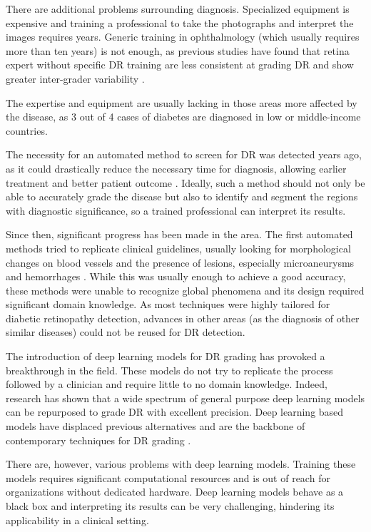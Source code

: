There are additional problems surrounding diagnosis. Specialized equipment is expensive and training a professional to take the photographs and interpret the images requires years. Generic training in ophthalmology (which usually requires more than ten years) is not enough, as previous studies have found that retina expert without specific DR training are less consistent at grading DR and show greater inter-grader variability \cite{grzybowski2022variability}.

The expertise and equipment are usually lacking in those areas more affected by the disease, as 3 out of 4 cases of diabetes are diagnosed in low or middle-income countries.

The necessity for an automated method to screen for DR was detected years ago, as it could drastically reduce the necessary time for diagnosis, allowing earlier treatment and better patient outcome \cite{diabeticretinopathydetection}. Ideally, such a method should not only be able to accurately grade the disease but also to identify and segment the regions with diagnostic significance, so a trained professional can interpret its results.

Since then, significant progress has been made in the area. The first automated methods tried to replicate clinical guidelines, usually looking for morphological changes on blood vessels and the presence of lesions, especially microaneurysms and hemorrhages \cite{verma2011detection}. While this was usually enough to achieve a good accuracy, these methods were unable to recognize global phenomena and its design required significant domain knowledge. As most techniques were highly tailored for diabetic retinopathy detection, advances in other areas (as the diagnosis of other similar diseases) could not be reused for DR detection.

The introduction of deep learning models for DR grading has provoked a breakthrough in the field. These models do not try to replicate the process followed by a clinician and require little to no domain knowledge. Indeed, research has shown that a wide spectrum of general purpose deep learning models can be repurposed to grade DR with excellent precision. Deep learning based models have displaced previous alternatives and are the backbone of contemporary techniques for DR grading \cite{gupta2018diabetic}. 

There are, however, various problems with deep learning models. Training these models requires significant computational resources and is out of reach for organizations without dedicated hardware. Deep learning models behave as a black box and interpreting its results can be very challenging, hindering its applicability in a clinical setting.

